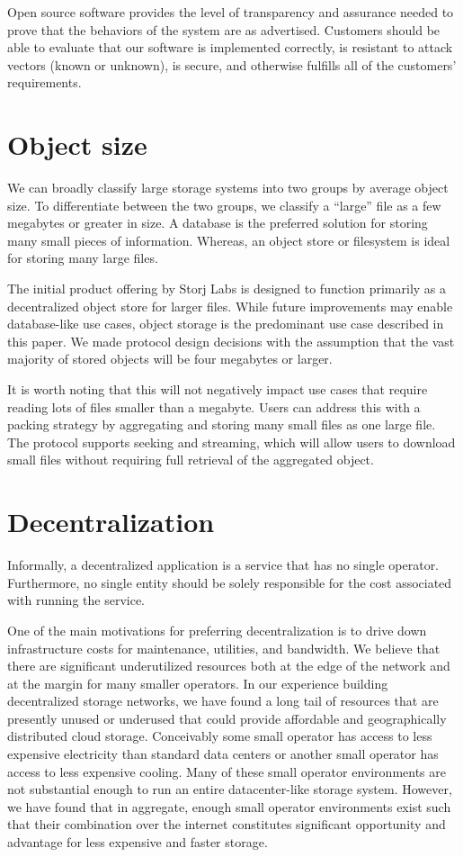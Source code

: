 \documentclass[11pt,fleqn,openany]{book}
\begin{document}
Open source software
provides the level of transparency and assurance needed to prove that the
behaviors of the system are as advertised. Customers should be able to
evaluate that our software is implemented correctly, is resistant to
attack vectors (known or unknown), is secure, and otherwise fulfills all
of the customers' requirements.

\section{Object size}

We can broadly classify large storage systems into two groups by average
object size. To differentiate between the two groups, we classify a ``large'' file as a
few megabytes or greater in size. A database is the preferred solution for storing many small pieces of information. Whereas, an object store or filesystem is ideal for storing many large files.

The initial product offering by Storj Labs is designed to function primarily as
a decentralized object store for larger files.
While future improvements may enable
database-like use cases, object storage is the predominant use case described in
this paper. We made protocol design decisions with the assumption that the
vast majority of stored objects will be four megabytes or larger.

It is worth noting that this will not negatively impact use cases that
require reading lots of files smaller than a megabyte. Users can address this
with a packing strategy by aggregating and storing many small files as one
large file.
The protocol supports seeking and streaming, which will allow users to download small files
without requiring full retrieval of the aggregated object.

\section{Decentralization}

Informally, a decentralized application is a service that has no single
operator. Furthermore, no single entity should be solely responsible for the
cost associated with running the service.

One of the main motivations for preferring decentralization is to drive
down infrastructure costs for maintenance, utilities, and bandwidth.
We believe that there
are significant underutilized resources both at the edge of the network and at
the margin for many smaller operators. In our experience building decentralized
storage networks, we have found a long tail of resources that are presently
unused or underused that could provide affordable and
geographically distributed cloud storage. Conceivably some small operator
has access to less expensive electricity than standard data centers or another small
operator has access to less expensive cooling. Many of these small operator
environments are not substantial enough to run an entire datacenter-like
storage system. However, we have found that in aggregate, enough small operator
environments exist such that their combination over the internet constitutes
significant opportunity and advantage for less expensive and faster storage.
\end{document}
